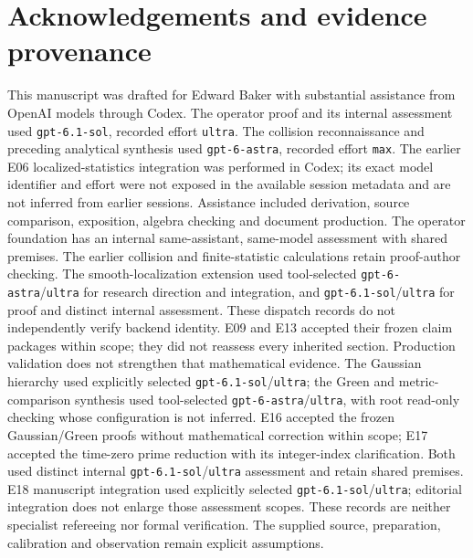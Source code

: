 \documentclass[11pt]{article}
\theoremstyle{definition}
\theoremstyle{remark}
\numberwithin{equation}{section}
\begin{document}
\clearpage
\tableofcontents
\clearpage




















\section*{Acknowledgements and evidence provenance}
This manuscript was drafted for Edward Baker with substantial assistance
from OpenAI models through Codex. The operator proof and its internal
assessment used \texttt{gpt-6.1-sol}, recorded effort \texttt{ultra}.
The collision reconnaissance and preceding analytical synthesis used
\texttt{gpt-6-astra}, recorded effort \texttt{max}. The earlier E06
localized-statistics integration was performed in Codex; its exact model
identifier and effort were not exposed in the available session metadata
and are not inferred from earlier sessions. Assistance included
derivation, source comparison, exposition, algebra checking and document
production. The operator foundation has an internal same-assistant,
same-model assessment with shared premises. The earlier collision and finite-statistic calculations
retain proof-author checking. The smooth-localization extension used
tool-selected \texttt{gpt-6-astra}/\texttt{ultra} for research direction
and integration, and \texttt{gpt-6.1-sol}/\texttt{ultra} for proof and
distinct internal assessment. These dispatch records do not independently
verify backend identity. E09 and E13 accepted their frozen claim packages
within scope; they did not reassess every inherited section. Production
validation does not strengthen that mathematical evidence. The Gaussian
hierarchy used explicitly selected \texttt{gpt-6.1-sol}/\texttt{ultra};
the Green and metric-comparison synthesis used tool-selected
\texttt{gpt-6-astra}/\texttt{ultra}, with root read-only checking whose
configuration is not inferred. E16 accepted the frozen Gaussian/Green
proofs without mathematical correction within scope; E17 accepted the
time-zero prime reduction with its integer-index clarification. Both used
distinct internal \texttt{gpt-6.1-sol}/\texttt{ultra} assessment and retain
shared premises. E18 manuscript integration used explicitly selected
\texttt{gpt-6.1-sol}/\texttt{ultra}; editorial integration does not enlarge
those assessment scopes. These records are neither specialist
refereeing nor formal verification. The supplied source, preparation,
calibration and observation remain explicit assumptions.
\begingroup\footnotesize


\endgroup
\end{document}
